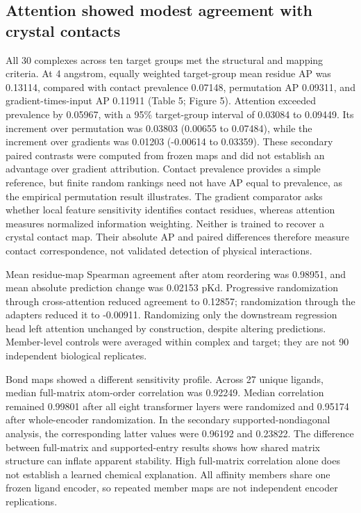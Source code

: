 \documentclass[12pt,a4paper]{article}
\begin{document}
\subsection*{Attention showed modest agreement with crystal contacts}
All 30 complexes across ten target groups met the structural and mapping criteria. At 4 angstrom, equally weighted target-group mean residue AP was 0.13114, compared with contact prevalence 0.07148, permutation AP 0.09311, and gradient-times-input AP 0.11911 (Table 5; Figure 5). Attention exceeded prevalence by 0.05967, with a 95\% target-group interval of 0.03084 to 0.09449. Its increment over permutation was 0.03803 (0.00655 to 0.07484), while the increment over gradients was 0.01203 (-0.00614 to 0.03359). These secondary paired contrasts were computed from frozen maps and did not establish an advantage over gradient attribution. Contact prevalence provides a simple reference, but finite random rankings need not have AP equal to prevalence, as the empirical permutation result illustrates. The gradient comparator asks whether local feature sensitivity identifies contact residues, whereas attention measures normalized information weighting. Neither is trained to recover a crystal contact map. Their absolute AP and paired differences therefore measure contact correspondence, not validated detection of physical interactions.

\nolinenumbers\linenumbers
Mean residue-map Spearman agreement after atom reordering was 0.98951, and mean absolute prediction change was 0.02153 pKd. Progressive randomization through cross-attention reduced agreement to 0.12857; randomization through the adapters reduced it to -0.00911. Randomizing only the downstream regression head left attention unchanged by construction, despite altering predictions. Member-level controls were averaged within complex and target; they are not 90 independent biological replicates.

Bond maps showed a different sensitivity profile. Across 27 unique ligands, median full-matrix atom-order correlation was 0.92249. Median correlation remained 0.99801 after all eight transformer layers were randomized and 0.95174 after whole-encoder randomization. In the secondary supported-nondiagonal analysis, the corresponding latter values were 0.96192 and 0.23822. The difference between full-matrix and supported-entry results shows how shared matrix structure can inflate apparent stability. High full-matrix correlation alone does not establish a learned chemical explanation. All affinity members share one frozen ligand encoder, so repeated member maps are not independent encoder replications.
\end{document}
